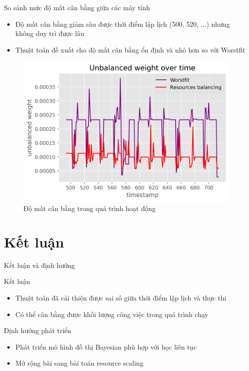 \documentclass[11pt,xcolor={dvipsnames}, aspectratio=169]{beamer}
\begin{document}
\begin{frame}
{So sánh mức độ mất cân bằng giữa các máy tính}

\begin{minipage}[t]{0.4\linewidth}
	\vspace{0.5cm}
	\begin{itemize}
		\item Độ mất cân bằng giảm sâu được thời điểm lập lịch (500, 520, ...) nhưng không duy trì được lâu 
		\item Thuật toán đề xuất cho độ mất cân bằng ổn định và nhỏ hơn so với Worstfit
	\end{itemize}
\end{minipage}
\hfill
\begin{minipage}[t]{0.59\linewidth}
	\begin{figure}[h!]
		\centering
		\includegraphics[scale=0.45]{images/unbalanced_weights.png}
		\caption{Độ mất cân bằng trong quá trình hoạt động}
	\end{figure}
\end{minipage}
\end{frame}

\section{Kết luận}

\begin{frame}
{Kết luận và định hướng}
\pause
\begin{block}
{Kết luận}
	\begin{itemize}
		\item Thuật toán đã cải thiện được sai số giữa thời điểm lập lịch và thực thi
		\item Có thể cân bằng được khối lượng công việc trong quá trình chạy 
	\end{itemize}
\end{block}

\begin{block}
{Định hướng phát triển}
\begin{itemize}
	\item Phát triển mô hình đồ thị Bayesian phù hợp với học liên tục 
	\item Mở rộng bài sang bài toán resource scaling
\end{itemize}
\end{block}
\end{frame}

{\1
\begin{frame}
\end{frame}}
\end{document}
